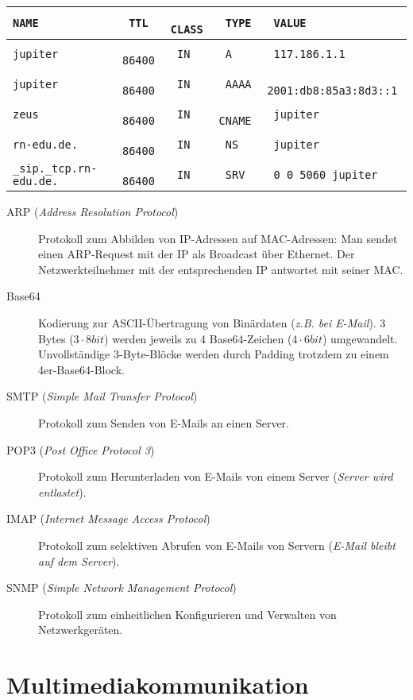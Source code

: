 \documentclass[a4paper]{article}
\begin{document}
\begin{tabular}{>{\tt}l>{\tt}l>{\tt}l>{\tt}l>{\tt}l}
    NAME & TTL & CLASS & TYPE & VALUE \\ \hline
    jupiter & 86400 & IN & A & 117.186.1.1 \\
    jupiter & 86400 & IN & AAAA & 2001:db8:85a3:8d3::1 \\
    zeus & 86400 & IN & CNAME & jupiter \\
    rn-edu.de. & 86400 & IN & NS & jupiter \\
    \_sip.\_tcp.rn-edu.de. & 86400 & IN & SRV & 0 0 5060 jupiter
\end{tabular}

\begin{description}
    \item[ARP (\textit{Address Resolution Protocol})] Protokoll zum Abbilden von IP-Adressen auf MAC-Adressen: Man sendet einen ARP-Request mit der IP als Broadcast über Ethernet. Der Netzwerkteilnehmer mit der entsprechenden IP antwortet mit seiner MAC.
    \item[Base64] Kodierung zur ASCII-Übertragung von Binärdaten (\textit{z.B. bei E-Mail}). 3 Bytes ($3 \cdot 8 bit$) werden jeweils zu 4 Base64-Zeichen ($4 \cdot 6 bit$) umgewandelt. Unvollständige 3-Byte-Blöcke werden durch Padding trotzdem zu einem 4er-Base64-Block.
    \item[SMTP (\textit{Simple Mail Transfer Protocol})] Protokoll zum Senden von E-Mails an einen Server.
    \item[POP3 (\textit{Post Office Protocol 3})] Protokoll zum Herunterladen von E-Mails von einem Server (\textit{Server wird entlastet}).
    \item[IMAP (\textit{Internet Message Access Protocol})] Protokoll zum selektiven Abrufen von E-Mails von Servern (\textit{E-Mail bleibt auf dem Server}).
    \item[SNMP (\textit{Simple Network Management Protocol})] Protokoll zum einheitlichen Konfigurieren und Verwalten von Netzwerkgeräten.
\end{description}

\section{Multimediakommunikation}
\end{document}

